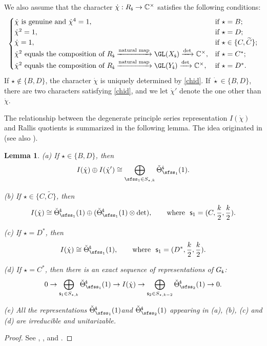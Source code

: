 \documentclass[12pt,a4paper]{amsart}
\newcommand{\be}{\begin {equation}}
\newcommand{\ee}{\end {equation}}
\numberwithin{equation}{section}
\newtheorem{lem}[thm]{Lemma}
\theoremstyle{remark}
\begin{document}
We also assume that the character $\dot \chi: R_{{\dot{\mathsf s}}}\rightarrow \mathbb{C}^\times $
satisfies  the following conditions:
\be\label{chid}
\begin{cases}
 \dot \chi \textrm{ is genuine and $\dot \chi^4=1$,}& \textrm{if $ \star=B$};\\
 \dot \chi^2=1,  & \textrm{if $\star=D$;}\\
 \dot \chi=1,\quad   &\textrm{if } \star\in \{C,\widetilde C\};\\
    \dot \chi^2\textrm{ equals the composition of $R_\dsfss\xrightarrow{\textrm{natural map}} \GL(X_\dsfss)\xrightarrow{\det}\C^\times$},  & \textrm{if $ \star=C^*$;}\\
 \dot \chi^2\textrm{ equals the composition of $R_\dsfss\xrightarrow{\textrm{natural map}} \GL(Y_\dsfss)\xrightarrow{\det}\C^\times$},  & \textrm{if $ \star=D^*$.}
\end{cases}
\ee
If  $\star\notin \{B,D\}$, the character   $\dot{\chi}$ is uniquely determined by \eqref{chid}.
If  $\dot \star\in \{B,D\}$, there are two characters satisfying \eqref{chid}, and we let $\dot \chi'$ denote the one other than $\dot \chi$.


The relationship between the degenerate principle series representation $I(\dot{\chi})$ and
Rallis quotients is summarized in the following lemma. The idea originated in \cite[Section II]{Ra} (see also \cite{KR}).

\begin{lem}\label{degens}%
\noindent
(a) If $\star\in \{B,D\}$,  then
\[
  I(\dot{\chi}) \oplus I(\dot \chi')\cong \bigoplus_{\sfss_1\in S_{\star, k}}
   \check \Theta_{\sfss_1}^{\dsfss}(1).
\]

\noindent
(b) If $\star\in \{C,\widetilde C\}$, then
\[
  I(\dot{\chi})\cong \check \Theta_{\sfss_1}^{\dsfss}(1)\oplus  (\check \Theta_{\sfss_1}^{\dsfss}(1)\otimes \det),\qquad \textrm{where } \ \mathsf s_1=(C, \frac{k}{2}, \frac{k}{2}).
\]


\noindent
(c) If $\star=D^*$, then
\[
  I(\dot{\chi})\cong \check \Theta_{\sfss_1}^{\dsfss}(1),\qquad \textrm{where }\ \mathsf s_1=(D^*,  \frac{k}{2}, \frac{k}{2}).
\]


\noindent
(d) If $\star=C^*$, then there is an exact sequence of representations of $G_{{\dot{\mathsf s}}}$:
\[
0\rightarrow \bigoplus_{\mathsf s_1\in S_{\star, k}} \check \Theta_{\sfss_1}^{\dsfss}(1) \rightarrow
 I(\dot{\chi})\rightarrow  \bigoplus_{\mathsf s_2\in S_{\star, k-2}} \check \Theta_{\sfss_2}^{\dsfss}(1) \rightarrow 0.
\]

\noindent
(e) All the representations $ \check \Theta_{\sfss_1}^{\dsfss}(1) $and $ \check \Theta_{\sfss_2}^{\dsfss}(1)$ appearing in (a), (b), (c) and (d) are irreducible and unitarizable.


\end{lem}
\begin{proof}
 See \cite[Theorem 2.4]{Ku}, \cite[Introduction]{LZ1}, \cite[Theorem 6.1]{LZ2} and  \cite[Sections 9 and 10]{Ya}.
\end{proof}
\end{document}
